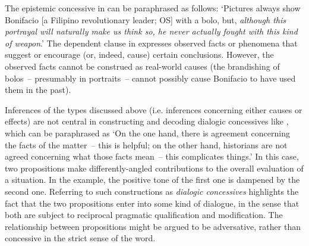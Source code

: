 The epistemic concessive in  can be paraphrased as follows: ‘Pictures always show Bonifacio [a Filipino revolutionary leader; OS] with a bolo, but, \textit{although this portrayal will naturally make us think so, he never actually fought with this kind of weapon}.’ The dependent clause in  expresses observed facts or phenomena that suggest or encourage (or, indeed, cause) certain conclusions. However, the observed facts cannot be construed as real-world causes (the brandishing of bolos~– presumably in portraits~– cannot possibly cause Bonifacio to have used them in the past).

\begin{sloppypar}
Inferences of the types discussed above (i.e. inferences concerning either causes or effects) are not central in constructing and decoding dialogic concessives like , which can be paraphrased as ‘On the one hand, there is agreement concerning the facts of the matter~– this is helpful; on the other hand, historians are not agreed concerning what those facts mean~– this complicates things.’ In this case, two propositions make differently-angled contributions to the overall evaluation of a situation. In the example, the positive tone of the first one is dampened by the second one. Referring to such constructions as \textit{dialogic concessives} highlights the fact that the two propositions enter into some kind of dialogue, in the sense that both are subject to reciprocal pragmatic qualification and modification. The relationship between propositions might be argued to be adversative, rather than concessive in the strict sense of the word.
\end{sloppypar}

